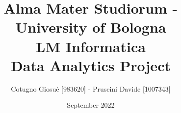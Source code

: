 \documentclass[11pt, openany]{book}
\title{Alma Mater Studiorum - University of Bologna \\ LM Informatica \\ \textbf{Data Analytics Project}}
\author{Cotugno Giosuè [983620] - Pruscini Davide [1007343]}
\date{September 2022}
\begin{document}
\maketitle

\tableofcontents











\renewcommand{\bibname}{References}


\end{document}
